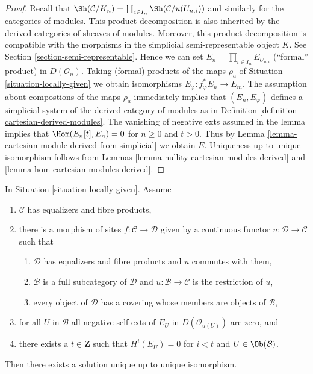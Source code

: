 \begin{proof}
Recall that
$\Sh(\mathcal{C}/K_n) = \prod_{i \in I_n} \Sh(\mathcal{C}/u(U_{n, i}))$
and similarly for the categories of modules. This product decomposition
is also inherited by the derived categories of sheaves of modules.
Moreover, this product decomposition is compatible with
the morphisms in the simplicial semi-representable object $K$.
See Section \ref{section-semi-representable}.
Hence we can set $E_n = \prod_{i \in I_n} E_{U_{n, i}}$
(``formal'' product) in $D(\mathcal{O}_n)$.
Taking (formal) products of the maps $\rho_a$ of
Situation \ref{situation-locally-given}
we obtain isomorphisms $E_\varphi : f_\varphi^*E_n \to E_m$.
The assumption about compostions of the maps $\rho_a$
immediately implies that $(E_n, E_\varphi)$
defines a simplicial system of the derived category of modules
as in Definition \ref{definition-cartesian-derived-modules}.
The vanishing of negative exts assumed in the lemma implies that
$\Hom(E_n[t], E_n) = 0$ for $n \geq 0$ and $t > 0$.
Thus by
Lemma \ref{lemma-cartesian-module-derived-from-simplicial}
we obtain $E$.
Uniqueness up to unique isomorphism follows from
Lemmas \ref{lemma-nullity-cartesian-modules-derived} and
\ref{lemma-hom-cartesian-modules-derived}.
\end{proof}

\begin{lemma}
\label{lemma-bbd-glueing}
In Situation \ref{situation-locally-given}. Assume
\begin{enumerate}
\item $\mathcal{C}$ has equalizers and fibre products,
\item there is a morphism of sites $f : \mathcal{C} \to \mathcal{D}$
given by a continuous functor $u : \mathcal{D} \to \mathcal{C}$
such that
\begin{enumerate}
\item $\mathcal{D}$ has equalizers and fibre products and $u$
commutes with them,
\item $\mathcal{B}$ is a full subcategory of $\mathcal{D}$
and $u : \mathcal{B} \to \mathcal{C}$ is the restriction of $u$,
\item every object of $\mathcal{D}$ has a covering whose members
are objects of $\mathcal{B}$,
\end{enumerate}
\item for all $U$ in $\mathcal{B}$ all negative self-exts of $E_U$
in $D(\mathcal{O}_{u(U)})$ are zero, and
\item there exists a $t \in \mathbf{Z}$ such that $H^i(E_U) = 0$ for $i < t$
and $U \in \Ob(\mathcal{B})$.
\end{enumerate}
Then there exists a solution unique up to unique isomorphism.
\end{lemma}

